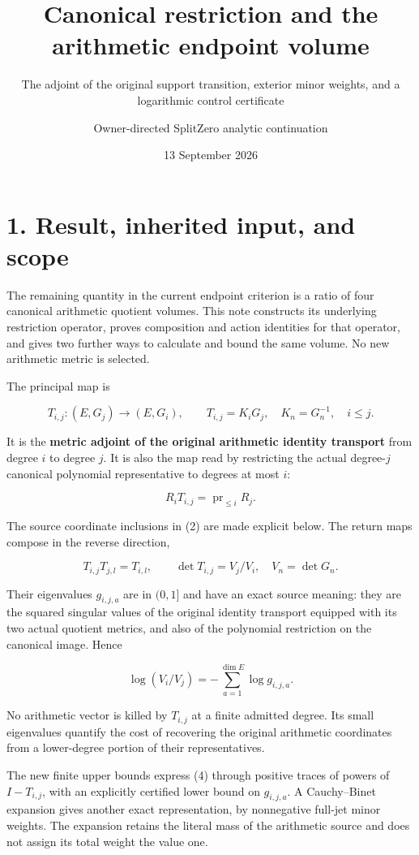 \documentclass[
  11pt,
]{article}
\title{Canonical restriction and the arithmetic endpoint volume}
\subtitle{The adjoint of the original support transition, exterior minor
weights, and a logarithmic control certificate}
\author{Owner-directed SplitZero analytic continuation}
\date{13 September 2026}
\begin{document}
\maketitle

{
\setcounter{tocdepth}{3}
\tableofcontents
}
\section{1. Result, inherited input, and
scope}\label{result-inherited-input-and-scope}

The remaining quantity in the current endpoint criterion is a ratio of
four canonical arithmetic quotient volumes. This note constructs its
underlying restriction operator, proves composition and action
identities for that operator, and gives two further ways to calculate
and bound the same volume. No new arithmetic metric is selected.

The principal map is

\[
 T_{i,j}:(E,G_j)\longrightarrow(E,G_i),\qquad
 T_{i,j}=K_iG_j,\quad K_n=G_n^{-1},\quad i\le j.                 \tag{1}
\]

It is the \textbf{metric adjoint of the original arithmetic identity
transport} from degree \(i\) to degree \(j\). It is also the map read by
restricting the actual degree-\(j\) canonical polynomial representative
to degrees at most \(i\):

\[
 R_iT_{i,j}=\operatorname{pr}_{\le i}R_j.                       \tag{2}
\]

The source coordinate inclusions in (2) are made explicit below. The
return maps compose in the reverse direction,

\[
 T_{i,j}T_{j,l}=T_{i,l},\qquad
 \det T_{i,j}=V_j/V_i,\quad V_n=\det G_n.                        \tag{3}
\]

Their eigenvalues \(g_{i,j,a}\) are in \((0,1]\) and have an exact
source meaning: they are the squared singular values of the original
identity transport equipped with its two actual quotient metrics, and
also of the polynomial restriction on the canonical image. Hence

\[
 \boxed{\log(V_i/V_j)=-\sum_{a=1}^{\dim E}\log g_{i,j,a}.}       \tag{4}
\]

No arithmetic vector is killed by \(T_{i,j}\) at a finite admitted
degree. Its small eigenvalues quantify the cost of recovering the
original arithmetic coordinates from a lower-degree portion of their
representatives.

The new finite upper bounds express (4) through positive traces of
powers of \(I-T_{i,j}\), with an explicitly certified lower bound on
\(g_{i,j,a}\). A Cauchy--Binet expansion gives another exact
representation, by nonnegative full-jet minor weights. The expansion
retains the literal mass of the arithmetic source and does not assign
its total weight the value one.
\end{document}
